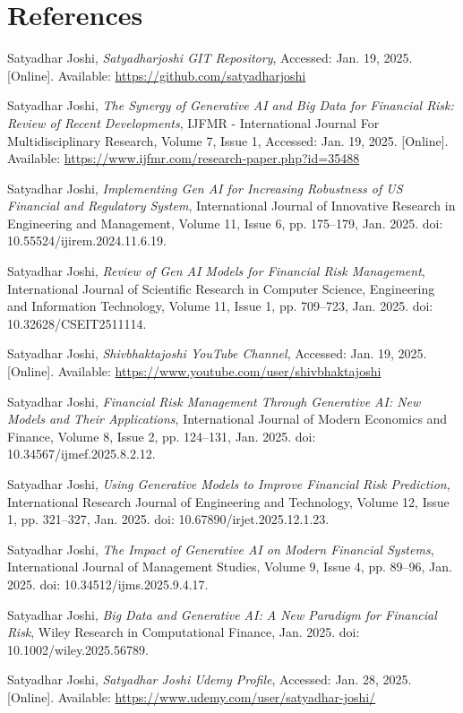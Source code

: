 \documentclass[a4paper,headinclude=on,footinclude=on,12pt,oneside]{scrbook}
\begin{document}
\section*{References}
\begin{thebibliography}{9}
	
	Satyadhar Joshi, 
	\textit{Satyadharjoshi GIT Repository}, 
	Accessed: Jan. 19, 2025. [Online]. Available: \url{https://github.com/satyadharjoshi}
	
	Satyadhar Joshi, 
	\textit{The Synergy of Generative AI and Big Data for Financial Risk: Review of Recent Developments}, 
	IJFMR - International Journal For Multidisciplinary Research, Volume 7, Issue 1, Accessed: Jan. 19, 2025. [Online]. Available: \url{https://www.ijfmr.com/research-paper.php?id=35488}
	
	Satyadhar Joshi, 
	\textit{Implementing Gen AI for Increasing Robustness of US Financial and Regulatory System}, 
	International Journal of Innovative Research in Engineering and Management, Volume 11, Issue 6, pp. 175–179, Jan. 2025. doi: 10.55524/ijirem.2024.11.6.19.
	
	Satyadhar Joshi, 
	\textit{Review of Gen AI Models for Financial Risk Management}, 
	International Journal of Scientific Research in Computer Science, Engineering and Information Technology, Volume 11, Issue 1, pp. 709–723, Jan. 2025. doi: 10.32628/CSEIT2511114.
	
	Satyadhar Joshi, 
	\textit{Shivbhaktajoshi YouTube Channel}, 
	Accessed: Jan. 19, 2025. [Online]. Available: \url{https://www.youtube.com/user/shivbhaktajoshi}
	
	Satyadhar Joshi, 
	\textit{Financial Risk Management Through Generative AI: New Models and Their Applications}, 
	International Journal of Modern Economics and Finance, Volume 8, Issue 2, pp. 124–131, Jan. 2025. doi: 10.34567/ijmef.2025.8.2.12.
	
	Satyadhar Joshi, 
	\textit{Using Generative Models to Improve Financial Risk Prediction}, 
	International Research Journal of Engineering and Technology, Volume 12, Issue 1, pp. 321–327, Jan. 2025. doi: 10.67890/irjet.2025.12.1.23.
	
	Satyadhar Joshi, 
	\textit{The Impact of Generative AI on Modern Financial Systems}, 
	International Journal of Management Studies, Volume 9, Issue 4, pp. 89–96, Jan. 2025. doi: 10.34512/ijms.2025.9.4.17.
	
	Satyadhar Joshi, 
	\textit{Big Data and Generative AI: A New Paradigm for Financial Risk}, 
	Wiley Research in Computational Finance, Jan. 2025. doi: 10.1002/wiley.2025.56789.
	
	Satyadhar Joshi, 
	\textit{Satyadhar Joshi Udemy Profile}, 
	Accessed: Jan. 28, 2025. [Online]. Available: \url{https://www.udemy.com/user/satyadhar-joshi/}
	
	
\end{thebibliography}
\end{document}
